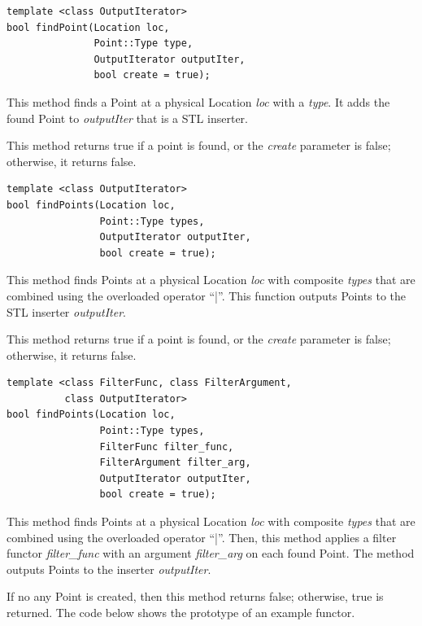 \documentclass[11pt]{article}
\begin{document}
\begin{verbatim}
template <class OutputIterator>
bool findPoint(Location loc,
               Point::Type type,
               OutputIterator outputIter,
               bool create = true);

\end{verbatim}



This method finds a Point at a physical Location \emph{loc} with a \emph{type}.  It adds
the found Point to \emph{outputIter} that is a STL inserter.

This method returns true if a point is found, or the \emph{create} parameter is
false; otherwise, it returns false.


\begin{verbatim}
template <class OutputIterator>
bool findPoints(Location loc,
                Point::Type types,
                OutputIterator outputIter,
                bool create = true);

\end{verbatim}



This method finds Points at a physical Location \emph{loc} with composite \emph{types}
that are combined using the overloaded operator ``|''. This function outputs
Points to the STL inserter \emph{outputIter}.

This method returns true if a point is found, or the \emph{create} parameter is
false; otherwise, it returns false.


\begin{verbatim}
template <class FilterFunc, class FilterArgument,
          class OutputIterator>
bool findPoints(Location loc,
                Point::Type types,
                FilterFunc filter_func,
                FilterArgument filter_arg,
                OutputIterator outputIter,
                bool create = true);

\end{verbatim}



This method finds Points at a physical Location \emph{loc} with composite \emph{types}
that are combined using the overloaded operator ``|''. Then, this method applies a
filter functor \emph{filter\_func} with an argument \emph{filter\_arg} on each found Point.
The method outputs Points to the inserter \emph{outputIter}.

If no any Point is created, then this method returns false; otherwise, true is
returned. The code below shows the prototype of an example functor.
\end{document}
